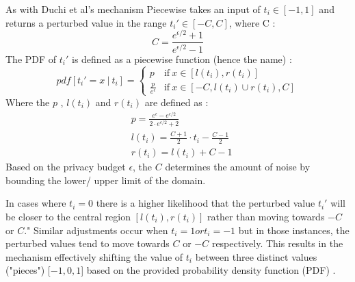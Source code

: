 As with Duchi et al's mechanism Piecewise takes an input of  $t_i \in [-1, 1]$ and returns a perturbed value in the range $t_i' \in [-C, C]$, where C \citep{wang_collecting_2019}:
\begin{equation}
    C = \frac{e^{\epsilon/2} + 1}{e^{\epsilon/2} - 1}
\end{equation}
The PDF of $t_i'$  is defined as a piecewise function (hence the name) \citep{wang_collecting_2019}:
\begin{equation}
    pdf [t_i' = x \ | \ t_i ] = 
    \begin{cases}
        p & \text{if} \ x \in [l(t_i), r(t_i)] \\ 
        \frac{p}{e^\epsilon} & \text{if} \ x \in [-C, l(t_i) \cup r(t_i), C]
    \end{cases}
    \label{eq:piecewise-domain}
\end{equation}
Where the $p$ , $l(t_i)$ and $r(t_i)$ are defined as \citep{wang_collecting_2019}:
\begin{align}
    \label{piecewise-p}
    & p = \frac{e^\epsilon - e^{\epsilon/2}}{2 \cdot e^{\epsilon/2} + 2} \\ 
    \label{piecewise-l-i}
    & l(t_i) = \frac{C + 1}{2} \cdot t_i - \frac{C - 1}{2} \\
    \label{piecewise-r-i}
    & r(t_i) = l(t_i) + C - 1
\end{align}
Based on the privacy budget $\epsilon$, the $C$ determines the amount of noise by bounding the lower/ upper limit of the domain.

In cases where $t_i = 0$ there is a higher likelihood that the perturbed value $t_i'$ will be closer to the central region $[l(t_i), r(t_i)]$ rather than moving towards $-C$ or $C$."
Similar adjustments occur when $t_i = 1 or t_i = -1$ but in those instances, the perturbed values tend to move towards $C$ or $-C$ respectively. 
This results in the mechanism effectively shifting the value of $t_i$ between three distinct values ("pieces") [$-1, 0, 1$] based on the provided probability density function (PDF) \citep{wang_collecting_2019}.


